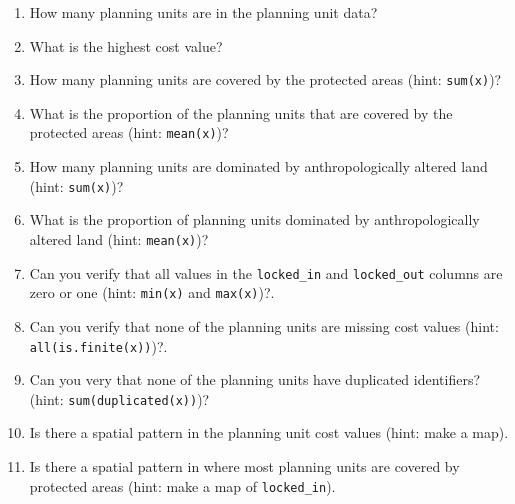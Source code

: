 \documentclass[12pt,]{book}
\providecommand{\tightlist}{%
  \setlength{\itemsep}{0pt}\setlength{\parskip}{0pt}}
\let\BeginKnitrBlock\begin \let\EndKnitrBlock\end
\begin{document}
\BeginKnitrBlock{rmdquestion}
\begin{enumerate}
\def\labelenumi{\arabic{enumi}.}
\tightlist
\item
  How many planning units are in the planning unit data?
\item
  What is the highest cost value?
\item
  How many planning units are covered by the protected areas (hint:
  \texttt{sum(x)})?
\item
  What is the proportion of the planning units that are covered by the
  protected areas (hint: \texttt{mean(x)})?
\item
  How many planning units are dominated by anthropologically altered
  land (hint: \texttt{sum(x)})?
\item
  What is the proportion of planning units dominated by
  anthropologically altered land (hint: \texttt{mean(x)})?
\item
  Can you verify that all values in the \texttt{locked\_in} and
  \texttt{locked\_out} columns are zero or one (hint: \texttt{min(x)}
  and \texttt{max(x)})?.
\item
  Can you verify that none of the planning units are missing cost values
  (hint: \texttt{all(is.finite(x))})?.
\item
  Can you very that none of the planning units have duplicated
  identifiers? (hint: \texttt{sum(duplicated(x))})?
\item
  Is there a spatial pattern in the planning unit cost values (hint:
  make a map).
\item
  Is there a spatial pattern in where most planning units are covered by
  protected areas (hint: make a map of \texttt{locked\_in}).
\end{enumerate}
\EndKnitrBlock{rmdquestion}
\end{document}

